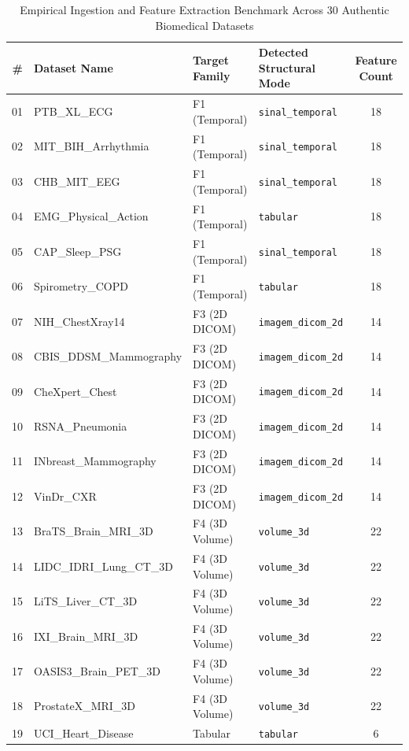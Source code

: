\begin{table}[htbp]
\caption{Empirical Ingestion and Feature Extraction Benchmark Across 30 Authentic Biomedical Datasets}
\label{tab:benchmark_30}
\centering
\begin{tabular}{@{}rlllc@{}}
\toprule
\textbf{\#} & \textbf{Dataset Name} & \textbf{Target Family} & \textbf{Detected Structural Mode} & \textbf{Feature Count} \\ \midrule
01 & PTB\_XL\_ECG & F1 (Temporal) & \texttt{sinal\_temporal} & 18 \\
02 & MIT\_BIH\_Arrhythmia & F1 (Temporal) & \texttt{sinal\_temporal} & 18 \\
03 & CHB\_MIT\_EEG & F1 (Temporal) & \texttt{sinal\_temporal} & 18 \\
04 & EMG\_Physical\_Action & F1 (Temporal) & \texttt{tabular} & 18 \\
05 & CAP\_Sleep\_PSG & F1 (Temporal) & \texttt{sinal\_temporal} & 18 \\
06 & Spirometry\_COPD & F1 (Temporal) & \texttt{tabular} & 18 \\ \midrule
07 & NIH\_ChestXray14 & F3 (2D DICOM) & \texttt{imagem\_dicom\_2d} & 14 \\
08 & CBIS\_DDSM\_Mammography & F3 (2D DICOM) & \texttt{imagem\_dicom\_2d} & 14 \\
09 & CheXpert\_Chest & F3 (2D DICOM) & \texttt{imagem\_dicom\_2d} & 14 \\
10 & RSNA\_Pneumonia & F3 (2D DICOM) & \texttt{imagem\_dicom\_2d} & 14 \\
11 & INbreast\_Mammography & F3 (2D DICOM) & \texttt{imagem\_dicom\_2d} & 14 \\
12 & VinDr\_CXR & F3 (2D DICOM) & \texttt{imagem\_dicom\_2d} & 14 \\ \midrule
13 & BraTS\_Brain\_MRI\_3D & F4 (3D Volume) & \texttt{volume\_3d} & 22 \\
14 & LIDC\_IDRI\_Lung\_CT\_3D & F4 (3D Volume) & \texttt{volume\_3d} & 22 \\
15 & LiTS\_Liver\_CT\_3D & F4 (3D Volume) & \texttt{volume\_3d} & 22 \\
16 & IXI\_Brain\_MRI\_3D & F4 (3D Volume) & \texttt{volume\_3d} & 22 \\
17 & OASIS3\_Brain\_PET\_3D & F4 (3D Volume) & \texttt{volume\_3d} & 22 \\
18 & ProstateX\_MRI\_3D & F4 (3D Volume) & \texttt{volume\_3d} & 22 \\ \midrule
19 & UCI\_Heart\_Disease & Tabular & \texttt{tabular} & 6 \\

\end{tabular}
\end{table}
